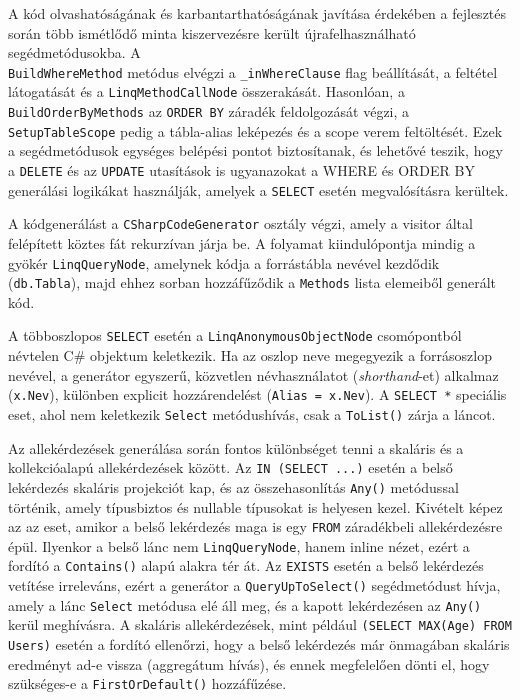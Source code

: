 A kód olvashatóságának és karbantarthatóságának javítása érdekében a fejlesztés során több ismétlődő minta kiszervezésre került újrafelhasználható segédmetódusokba. A \\ \texttt{BuildWhereMethod} metódus elvégzi a \texttt{\_inWhereClause} flag beállítását, a feltétel látogatását és a \texttt{LinqMethodCallNode} összerakását. Hasonlóan, a \texttt{BuildOrderByMethods} az \texttt{ORDER BY} záradék feldolgozását végzi, a \texttt{SetupTableScope} pedig a tábla-alias leképezés és a scope verem feltöltését. Ezek a segédmetódusok egységes belépési pontot biztosítanak, és lehetővé teszik, hogy a \texttt{DELETE} és az \texttt{UPDATE} utasítások is ugyanazokat a WHERE és ORDER BY generálási logikákat használják, amelyek a \texttt{SELECT} esetén megvalósításra kerültek.


A kódgenerálást a \texttt{CSharpCodeGenerator} osztály végzi, amely a visitor által felépített köztes fát rekurzívan járja be. A folyamat kiindulópontja mindig a gyökér \texttt{LinqQueryNode}, amelynek kódja a forrástábla nevével kezdődik (\texttt{db.Tabla}), majd ehhez sorban hozzáfűződik a \texttt{Methods} lista elemeiből generált kód.

A többoszlopos \texttt{SELECT} esetén a \texttt{LinqAnonymousObjectNode} csomópontból névtelen C\# objektum keletkezik. Ha az oszlop neve megegyezik a forrásoszlop nevével, a generátor egyszerű, közvetlen névhasználatot (\textit{shorthand}-et) alkalmaz (\texttt{x.Nev}), különben explicit hozzárendelést (\texttt{Alias = x.Nev}). A \texttt{SELECT *} speciális eset, ahol nem keletkezik \texttt{Select} metódushívás, csak a \texttt{ToList()} zárja a láncot.

Az allekérdezések generálása során fontos különbséget tenni a skaláris és a kollekcióalapú allekérdezések között. Az \texttt{IN (SELECT ...)} esetén a belső lekérdezés skaláris projekciót kap, és az összehasonlítás \texttt{Any()} metódussal történik, amely típusbiztos és nullable típusokat is helyesen kezel. Kivételt képez az az eset, amikor a belső lekérdezés maga is egy \texttt{FROM} záradékbeli allekérdezésre épül. Ilyenkor a belső lánc nem \texttt{LinqQueryNode}, hanem inline nézet, ezért a fordító a \texttt{Contains()} alapú alakra tér át. Az \texttt{EXISTS} esetén a belső lekérdezés vetítése irreleváns, ezért a generátor a \texttt{QueryUpToSelect()} segédmetódust hívja, amely a lánc \texttt{Select} metódusa elé áll meg, és a kapott lekérdezésen az \texttt{Any()} kerül meghívásra. A skaláris allekérdezések, mint például \texttt{(SELECT MAX(Age) FROM Users)} esetén a fordító ellenőrzi, hogy a belső lekérdezés már önmagában skaláris eredményt ad-e vissza (aggregátum hívás), és ennek megfelelően dönti el, hogy szükséges-e a \texttt{FirstOrDefault()} hozzáfűzése.

